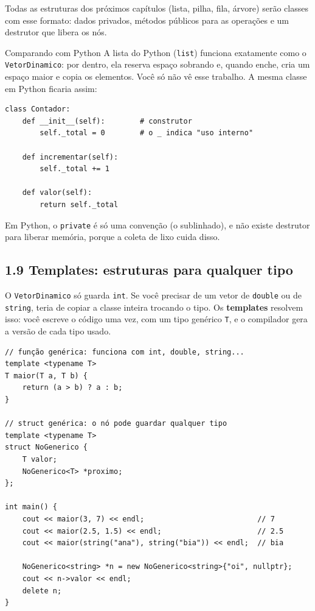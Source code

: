 Todas as estruturas dos próximos capítulos (lista, pilha, fila, árvore) serão classes com esse formato: dados privados, métodos públicos para as operações e um destrutor que libera os nós.

\begin{destaque}{Comparando com Python}
A lista do Python (\texttt{list}) funciona exatamente como o \texttt{VetorDinamico}: por dentro, ela reserva espaço sobrando e, quando enche, cria um espaço maior e copia os elementos. Você só não vê esse trabalho. A mesma classe em Python ficaria assim:

\begin{codigo}
\begin{Verbatim}[breaklines=true, breaksymbolleft={}, fontsize=\footnotesize]
class Contador:
    def __init__(self):        # construtor
        self._total = 0        # o _ indica "uso interno"

    def incrementar(self):
        self._total += 1

    def valor(self):
        return self._total
\end{Verbatim}
\end{codigo}

Em Python, o \texttt{private} é só uma convenção (o sublinhado), e não existe destrutor para liberar memória, porque a coleta de lixo cuida disso.
\end{destaque}

\subsection{1.9 Templates: estruturas para qualquer tipo}

O \texttt{VetorDinamico} só guarda \texttt{int}. Se você precisar de um vetor de \texttt{double} ou de \texttt{string}, teria de copiar a classe inteira trocando o tipo. Os \textbf{templates} resolvem isso: você escreve o código uma vez, com um tipo genérico \texttt{T}, e o compilador gera a versão de cada tipo usado.

\begin{codigo}
\begin{Verbatim}[breaklines=true, breaksymbolleft={}, fontsize=\footnotesize]
// função genérica: funciona com int, double, string...
template <typename T>
T maior(T a, T b) {
    return (a > b) ? a : b;
}

// struct genérica: o nó pode guardar qualquer tipo
template <typename T>
struct NoGenerico {
    T valor;
    NoGenerico<T> *proximo;
};

int main() {
    cout << maior(3, 7) << endl;                          // 7
    cout << maior(2.5, 1.5) << endl;                      // 2.5
    cout << maior(string("ana"), string("bia")) << endl;  // bia

    NoGenerico<string> *n = new NoGenerico<string>{"oi", nullptr};
    cout << n->valor << endl;
    delete n;
}
\end{Verbatim}
\end{codigo}

